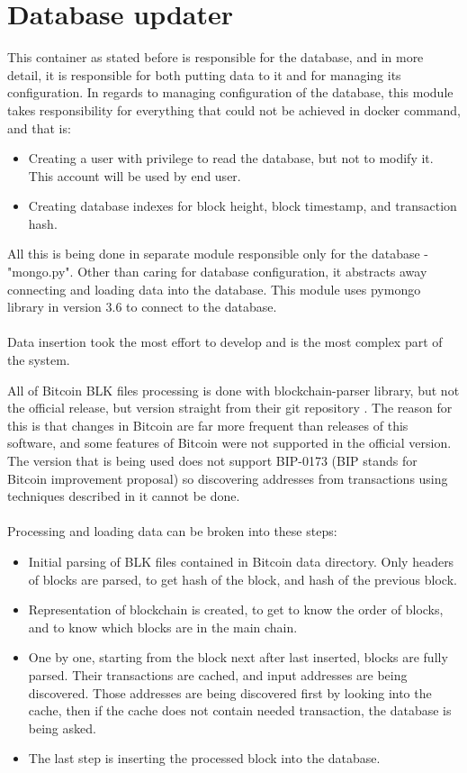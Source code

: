 \documentclass[12pt, en, eng, twoside, final]{mgr}
\begin{document}
\section{Database updater}
This container as stated before is responsible for the database, and in more detail, it is responsible for both putting data to it and for managing its configuration. In regards to managing configuration of the database, this module takes responsibility for everything that could not be achieved in docker command, and that is:

\begin{itemize}
\item
Creating a user with privilege to read the database, but not to modify it. This account will be used by end user.
\item
Creating database indexes for block height, block timestamp, and transaction hash.
\end{itemize}

All this is being done in separate module responsible only for the database - "mongo.py". Other than caring for database configuration, it abstracts away connecting and loading data into the database. This module uses pymongo\cite{pymongo} library in version 3.6 to connect to the database.
\\
\\  
Data insertion took the most effort to develop and is the most complex part of the system.

All of Bitcoin BLK files processing is done with blockchain-parser\cite{blockchain-parser} library, but not the official release, but version straight from their git repository \cite{blockchain-parser}. The reason for this is that changes in Bitcoin are far more frequent than releases of this software, and some features of Bitcoin were not supported in the official version. The version that is being used does not support BIP-0173 \cite{bip173} (BIP stands for Bitcoin improvement proposal) so discovering addresses from transactions using techniques described in it cannot be done. 
\\
\\
Processing and loading data can be broken into these steps:
\begin{itemize}
\item
Initial parsing of BLK files contained in Bitcoin data directory. Only headers of blocks are parsed, to get hash of the block, and hash of the previous block.
\item
Representation of blockchain is created, to get to know the order of blocks, and to know which blocks are in the main chain.
\item
One by one, starting from the block next after last inserted, blocks are fully parsed. Their transactions are cached, and input addresses are being discovered. Those addresses are being discovered first by looking into the cache, then if the cache does not contain needed transaction, the database is being asked.
\item
The last step is inserting the processed block into the database.
\end{itemize}
\end{document}
